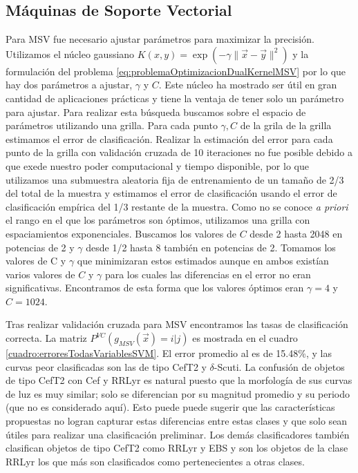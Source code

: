 \documentclass[letterpaper,12pt]{book}
\begin{document}
\subsection{Máquinas de Soporte Vectorial}

Para MSV fue necesario ajustar parámetros para maximizar la precisión. Utilizamos el núcleo gaussiano $K(x,y) = \exp(-\gamma\|\vec{x}-\vec{y}\|^2)$ y la formulación del problema \ref{eq:problemaOptimizacionDualKernelMSV} por lo que hay dos parámetros a ajustar, $\gamma$ y $C$. Este núcleo ha mostrado ser útil en gran cantidad de aplicaciones prácticas \cite{cristianini_introduction_2000} y tiene la ventaja de tener solo un parámetro para ajustar. Para realizar esta búsqueda buscamos sobre el espacio de parámetros utilizando una grilla. Para cada punto $\gamma, C$ de la grila de la grilla estimamos el error de clasificación. Realizar la estimación del error para cada punto de la grilla con validación cruzada de 10 iteraciones no fue posible debido a que exede nuestro poder computacional y tiempo disponible, por lo que utilizamos una submuestra aleatoria fija de entrenamiento de un tamaño de 2/3 del total de la muestra y estimamos el error de clasificación usando el error de clasificación empírica del 1/3 restante de la muestra. Como no se conoce \textit{a priori} el rango en el que los parámetros son óptimos, utilizamos una grilla con espaciamientos exponenciales. Buscamos los valores de $C$ desde 2 hasta 2048 en potencias de 2 y $\gamma$ desde 1/2 hasta 8 también en potencias de 2. Tomamos los valores de C y $\gamma$ que minimizaran estos estimados aunque en ambos existían varios valores de $C$ y $\gamma$ para los cuales las diferencias en el error no eran significativas. Encontramos de esta forma que los valores óptimos eran $\gamma = 4$ y $C = 1024$. 

Tras realizar validación cruzada para MSV encontramos las tasas de clasificación correcta. La matriz $P^{VC}(g_{MSV}(\vec{x})=i|j)$ es mostrada en el cuadro  \ref{cuadro:erroresTodasVariablesSVM}. El error promedio al es  de 15.48\%, y las curvas peor clasificadas son las de tipo CefT2 y $\delta$-Scuti. La confusión de objetos de tipo CefT2 con Cef y RRLyr es natural puesto que la morfología de sus curvas de luz es muy similar; solo se diferencian por su magnitud promedio y su periodo (que no es considerado aquí). Esto puede puede sugerir que las características propuestas no logran capturar estas diferencias entre estas clases y que solo sean útiles para realizar una clasificación preliminar. Los demás clasificadores también clasifican objetos de tipo CefT2 como RRLyr y EBS y son los objetos de la clase RRLyr los que más son clasificados como pertenecientes a otras clases. 
\end{document}
